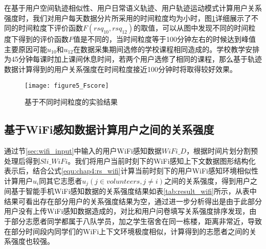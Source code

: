 \par 在基于用户空间轨迹相似性、用户日常语义轨迹、用户轨迹运动模式计算用户关系强度时，我们对用户每天数据分片所采用的时间粒度均为小时，图\ref{fig:timeslice}详细展示了不同的时间粒度下评价函数$F(rsq_{10},rsq_{12})$的取值，可以从图中发现不同的时间粒度下得到的评价函数$F$值是不同的，当时间粒度等于100分钟左右的时候达到峰值主要原因可能$u_{10}$和$u_{12}$在数据采集期间选修的学校课程相同造成的。学校教学安排为45分钟每课时加上课间休息时间，若两个用户选修了相同的课程，那么基于轨迹数据计算得到的用户关系强度在时间粒度接近100分钟时将取得较好效果。
\begin{figure}[htb]
\centering
\texttt{[image: figure5\_Fscore]}
\caption{基于不同时间粒度的实验结果}
\label{fig:timeslice}
\end{figure}

\subsection{基于WiFi感知数据计算用户之间的关系强度}
通过节\ref{sec:wifi_input}中输入的用户WiFi感知数据$WiFi\_D$，根据时间片划分割预处理后得到$Sli\_WiFi$。我们将用户当前时刻下的WiFi感知上下文数据图形结构化表示后，结合公式\ref{equ:chap4:rs_wifi}计算当前时刻下的用户WiFi感知环境相似性计算用户$u_{i}$同其它志愿者$u_{j}(j \in volunteers, j \neq i)$之间的关系强度，得到用户之间基于智能手机WiFi感知数据的关系强度结果如表\ref{tab:result_wifi}所示，从表中结果可看出存在部分用户的关系强度结果为空，通过进一步分析得出是由于此部分用户没有上传WiFi感知数据造成的，对比和用户问卷填写关系强度排序发现，由于部分志愿者同学都属于八队学员，加之学生宿舍在同一栋楼，距离非常近，导致在部分时间段内同学们的WiFi上下文环境极度相似，计算得到的志愿者之间的关系强度也较强。
